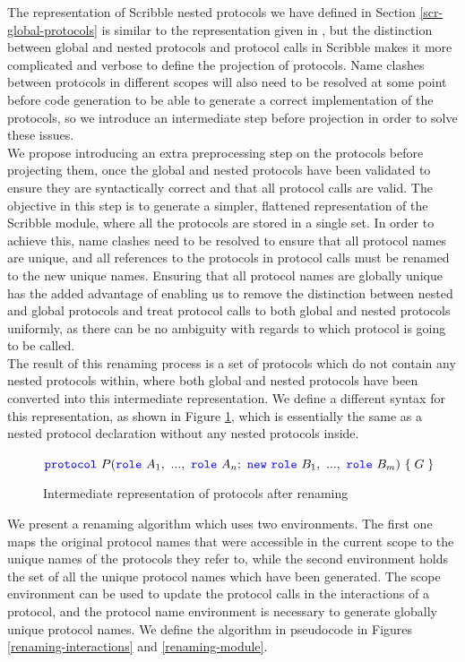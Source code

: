 \documentclass[12pt,twoside]{report}
\begin{document}
The representation of Scribble nested protocols we have defined in Section \ref{scr-global-protocols} is similar to the representation given in \cite{nestedprotocols}, but the distinction between global and nested protocols and protocol calls in Scribble makes it more complicated and verbose to define the projection of protocols. Name clashes between protocols in different scopes will also need to be resolved at some point before code generation to be able to generate a correct implementation of the protocols, so we introduce an intermediate step before projection in order to solve these issues.\\

We propose introducing an extra preprocessing step on the protocols before projecting them, once the global and nested protocols have been validated to ensure they are syntactically correct and that all protocol calls are valid. The objective in this step is to generate a simpler, flattened representation of the Scribble module, where all the protocols are stored in a single set. In order to achieve this, name clashes need to be resolved to ensure that all protocol names are unique, and all references to the protocols in protocol calls must be renamed to the new unique names. Ensuring that all protocol names are globally unique has the added advantage of enabling us to remove the distinction between nested and global protocols and treat protocol calls to both global and nested protocols uniformly, as there can be no ambiguity with regards to which protocol is going to be called.\\

The result of this renaming process is a set of protocols which do not contain any nested protocols within, where both global and nested protocols have been converted into this intermediate representation. We define a different syntax for this representation, as shown in Figure \ref{protocols-after-renaming}, which is essentially the same as a nested protocol declaration without any nested protocols inside.\\

\begin{figure}[h!]
    \centering
    $\protocol\ P(\role\ A_1,\ ...,\ \role\ A_n;\ \scrnew\ \role\ B_1,\ ...,\ \role\ B_m)\ \{\;G\;\}$\\
    \caption{Intermediate representation of protocols after renaming}
    \label{protocols-after-renaming}
\end{figure}

We present a renaming algorithm which uses two environments. The first one maps the original protocol names that were accessible in the current scope to the unique names of the protocols they refer to, while the second environment holds the set of all the unique protocol names which have been generated. The scope environment can be used to update the protocol calls in the interactions of a protocol, and the protocol name environment is necessary to generate globally unique protocol names. We define the algorithm in pseudocode in Figures \ref{renaming-interactions} and \ref{renaming-module}.
\end{document}
